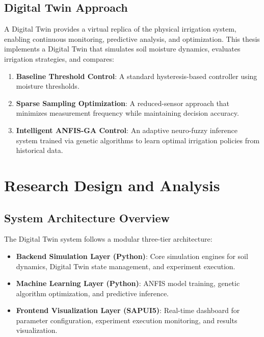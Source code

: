 \subsection{Digital Twin Approach}

A Digital Twin provides a virtual replica of the physical irrigation system, enabling continuous monitoring, predictive analysis, and optimization. This thesis implements a Digital Twin that simulates soil moisture dynamics, evaluates irrigation strategies, and compares:

\begin{enumerate}
    \item \textbf{Baseline Threshold Control}: A standard hysteresis-based controller using moisture thresholds.
    \item \textbf{Sparse Sampling Optimization}: A reduced-sensor approach that minimizes measurement frequency while maintaining decision accuracy.
    \item \textbf{Intelligent ANFIS-GA Control}: An adaptive neuro-fuzzy inference system trained via genetic algorithms to learn optimal irrigation policies from historical data.
\end{enumerate}


\section{Research Design and Analysis}
\label{sec:ch3sec2}

\subsection{System Architecture Overview}

The Digital Twin system follows a modular three-tier architecture:

\begin{itemize}
    \item \textbf{Backend Simulation Layer (Python)}: Core simulation engines for soil dynamics, Digital Twin state management, and experiment execution.
    \item \textbf{Machine Learning Layer (Python)}: ANFIS model training, genetic algorithm optimization, and predictive inference.
    \item \textbf{Frontend Visualization Layer (SAPUI5)}: Real-time dashboard for parameter configuration, experiment execution monitoring, and results visualization.
\end{itemize}

